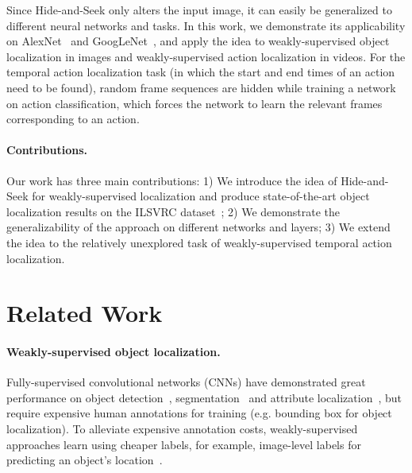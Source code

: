 \documentclass[10pt,twocolumn,letterpaper]{article}
\begin{document}
Since Hide-and-Seek only alters the input image, it can easily be generalized to different neural networks and tasks.  In this work, we demonstrate its applicability on AlexNet~\cite{krizhevsky-nips2012} and GoogLeNet~\cite{Szegedy-CVPR2015}, and apply the idea to weakly-supervised object localization in images and weakly-supervised action localization in videos.  For the temporal action localization task (in which the start and end times of an action need to be found), random frame sequences are hidden while training a network on action classification, which forces the network to learn the relevant frames corresponding to an action.

\vspace{-10pt}\paragraph{Contributions.} Our work has three main contributions: 1) We introduce the idea of Hide-and-Seek for weakly-supervised localization and produce state-of-the-art object localization results on the ILSVRC dataset~\cite{Russakovsky-IJCV2015}; 2) We demonstrate the generalizability of the approach on different networks and layers; 3) We extend the idea to the relatively unexplored task of weakly-supervised temporal action localization. 
\section{Related Work}\paragraph{Weakly-supervised object localization.}
Fully-supervised convolutional networks (CNNs) have demonstrated great performance on object detection~\cite{girshick-cvpr2014,girshick-iccv2015,liu-eccv2016}, segmentation~\cite{long-cvpr2015} and attribute localization~\cite{duan-cvpr2012,zhang-cvpr2014,kiapour-eccv2014}, but require expensive human annotations for training (e.g. bounding box for object localization). To alleviate expensive annotation costs, weakly-supervised approaches learn using cheaper labels, for example, image-level labels for predicting an object's location~\cite{weber-eccv2000,fergus-cvpr2003,Crandall-ECCV2006,siva-eccv2012,bilen-bmcv2014,song-nips2014,wang-eccv2014,cinbis-arxiv2015,Oquab-cvpr15,zhou-cvpr2016}. 
\end{document}
